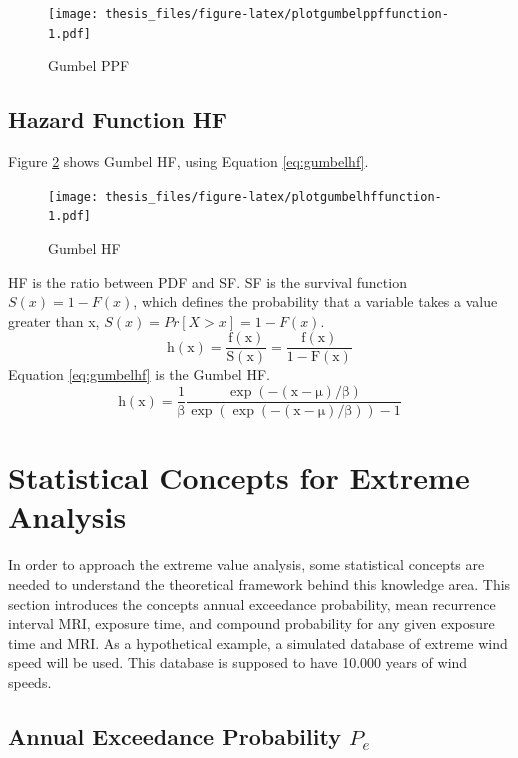 \documentclass[12pt,twoside]{reedthesis}
\begin{document}
\footnotesize
\begin{figure}
\centering
\texttt{[image: thesis\_files/figure-latex/plotgumbelppffunction-1.pdf]}
\caption{\label{fig:plotgumbelppffunction}Gumbel PPF}
\end{figure}
\normalsize

\hypertarget{hf}{%
\subsection{Hazard Function HF}\label{hf}}

Figure \ref{fig:plotgumbelhffunction} shows Gumbel HF, using Equation \eqref{eq:gumbelhf}.

\footnotesize
\begin{figure}
\centering
\texttt{[image: thesis\_files/figure-latex/plotgumbelhffunction-1.pdf]}
\caption{\label{fig:plotgumbelhffunction}Gumbel HF}
\end{figure}
\normalsize

HF is the ratio between PDF and SF. SF is the survival function \(S(x) = 1 - F(x)\), which defines the probability that a variable takes a value greater than x, \(S(x) = Pr[X > x] = 1 - F(x)\).
\begin{equation}
\mathrm{
        h(x) = \frac{f(x)}{S(x)} = \frac{f(x)}{1-F(x)}
       }
  \label{eq:hf}
\end{equation}
Equation \eqref{eq:gumbelhf} is the Gumbel HF.
\begin{equation}
\mathrm{
        h(x)= \frac{1}{\beta}\frac{\exp(-(x-\mu)/\beta)}{\exp(\exp(-(x-\mu)/\beta))-1}
       }
  \label{eq:gumbelhf}
\end{equation}
\hypertarget{statistical-concepts-for-extreme-analysis}{%
\section{Statistical Concepts for Extreme Analysis}\label{statistical-concepts-for-extreme-analysis}}

In order to approach the extreme value analysis, some statistical concepts are needed to understand the theoretical framework behind this knowledge area. This section introduces the concepts annual exceedance probability, mean recurrence interval MRI, exposure time, and compound probability for any given exposure time and MRI. As a hypothetical example, a simulated database of extreme wind speed will be used. This database is supposed to have 10.000 years of wind speeds.

\hypertarget{annual-exceedance-probability-p_e}{%
\subsection{\texorpdfstring{Annual Exceedance Probability \(P_e\)}{Annual Exceedance Probability P\_e}}\label{annual-exceedance-probability-p_e}}
\end{document}
